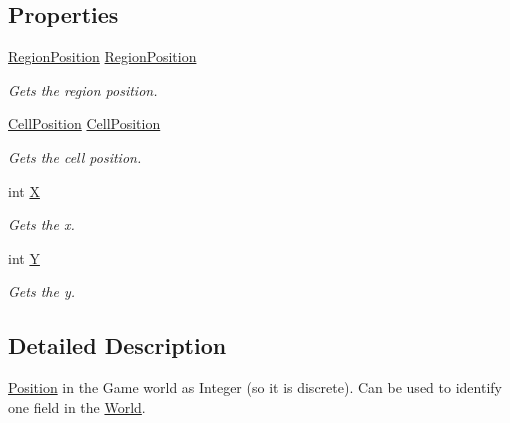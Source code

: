 \subsection*{Properties}
\begin{DoxyCompactItemize}
\item 
\hyperlink{classCore_1_1Models_1_1RegionPosition}{Region\+Position} \hyperlink{classCore_1_1Models_1_1PositionI_a0662e0b43f175a5320f043298984659b}{Region\+Position}
\begin{DoxyCompactList}\small\item\em Gets the region position. \end{DoxyCompactList}\item 
\hyperlink{classCore_1_1Models_1_1CellPosition}{Cell\+Position} \hyperlink{classCore_1_1Models_1_1PositionI_a205a6a5cdd2e73781c2adf0b370402a9}{Cell\+Position}
\begin{DoxyCompactList}\small\item\em Gets the cell position. \end{DoxyCompactList}\item 
int \hyperlink{classCore_1_1Models_1_1PositionI_a2612b865ceba85b37714a5d19a0228c5}{X}
\begin{DoxyCompactList}\small\item\em Gets the x. \end{DoxyCompactList}\item 
int \hyperlink{classCore_1_1Models_1_1PositionI_ae8a742f3f984a83b3fc7706a2c9ed254}{Y}
\begin{DoxyCompactList}\small\item\em Gets the y. \end{DoxyCompactList}\end{DoxyCompactItemize}


\subsection{Detailed Description}
\hyperlink{classCore_1_1Models_1_1Position}{Position} in the Game world as Integer (so it is discrete). Can be used to identify one field in the \hyperlink{classCore_1_1Models_1_1World}{World}. 



